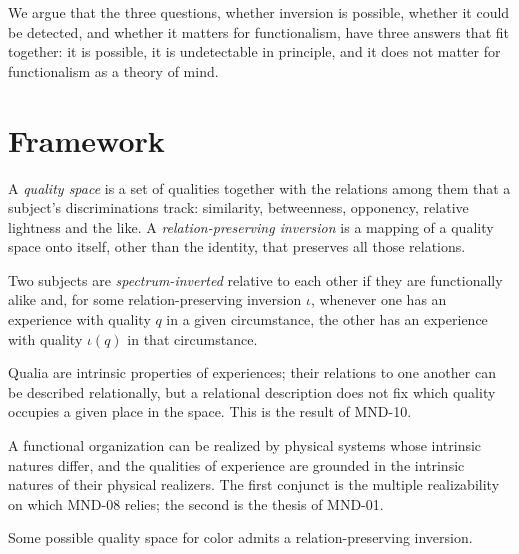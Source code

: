 \documentclass{situationist-preprint}
\begin{document}
We argue that the three questions, whether inversion is possible, whether it could be detected, and whether it matters for functionalism, have three answers that fit together: it is possible, it is undetectable in principle, and it does not matter for functionalism as a theory of mind.

\section{Framework}

\begin{definition}\label{d:space}
A \emph{quality space} is a set of qualities together with the relations among them that a subject's discriminations track: similarity, betweenness, opponency, relative lightness and the like. A \emph{relation-preserving inversion} is a mapping of a quality space onto itself, other than the identity, that preserves all those relations.
\end{definition}

\begin{definition}\label{d:inv}
Two subjects are \emph{spectrum-inverted} relative to each other if they are functionally alike and, for some relation-preserving inversion $\iota$, whenever one has an experience with quality $q$ in a given circumstance, the other has an experience with quality $\iota(q)$ in that circumstance.
\end{definition}

\begin{assumption}\label{a:intr}
Qualia are intrinsic properties of experiences; their relations to one another can be described relationally, but a relational description does not fix which quality occupies a given place in the space. This is the result of MND-10.
\end{assumption}

\begin{assumption}\label{a:real}
A functional organization can be realized by physical systems whose intrinsic natures differ, and the qualities of experience are grounded in the intrinsic natures of their physical realizers. The first conjunct is the multiple realizability on which MND-08 relies; the second is the thesis of MND-01.
\end{assumption}

\begin{assumption}[Symmetry]\label{a:sym}
Some possible quality space for color admits a relation-preserving inversion.
\end{assumption}
\end{document}
